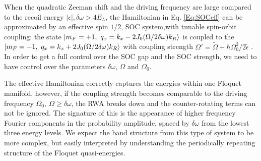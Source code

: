 When the quadratic Zeeman shift and the driving frequency are large compared to the recoil energy $|\epsilon|, \delta\omega >4E_L$, the Hamiltonian in Eq. \ref{Eq:SOCeff} can be approximated by an effective spin $1/2$, SOC system,with tunable spin-orbit coupling: the state $\ket{m_F=+1,\ q_x=k_x-2J_0(\Omega/2\delta\omega)k_R}$ is coupled to the $\ket{m_F=-1,\ q_x=k_x+2J_0(\Omega/2\delta\omega)k_R}$ with coupling strength  $\Omega'=\tilde{\Omega}+\hbar\Omega_0^2/2\tilde{\epsilon}$ \cite{l._j._leblanc_direct_2013}. In order to get a full control over the SOC gap and the SOC strength, we need to have control over the parameters $\delta\omega$, $\Omega$ and $\Omega_0$.

The effective Hamiltonian correctly captures the energies within one Floquet manifold, however, if the coupling strength becomes comparable to the driving frequency $\Omega_0,\ \Omega\geq\delta\omega$, the RWA breaks down and the counter-rotating terms can not be ignored. The signature of this is the appearance of higher frequency Fourier components in the probability amplitude, spaced by $\delta\omega$ from the lowest three energy levels. We expect the band structure from this type of system to be more complex, but easily interpreted by understanding the periodically repeating structure of the Floquet quasi-energies. 
 











